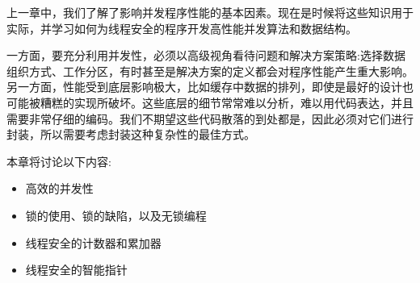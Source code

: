 上一章中，我们了解了影响并发程序性能的基本因素。现在是时候将这些知识用于实际，并学习如何为线程安全的程序开发高性能并发算法和数据结构。

一方面，要充分利用并发性，必须以高级视角看待问题和解决方案策略:选择数据组织方式、工作分区，有时甚至是解决方案的定义都会对程序性能产生重大影响。另一方面，性能受到底层影响极大，比如缓存中数据的排列，即使是最好的设计也可能被糟糕的实现所破坏。这些底层的细节常常难以分析，难以用代码表达，并且需要非常仔细的编码。我们不期望这些代码散落的到处都是，因此必须对它们进行封装，所以需要考虑封装这种复杂性的最佳方式。

本章将讨论以下内容:

\begin{itemize}
\item 高效的并发性
\item 锁的使用、锁的缺陷，以及无锁编程
\item 线程安全的计数器和累加器
\item 线程安全的智能指针
\end{itemize}





